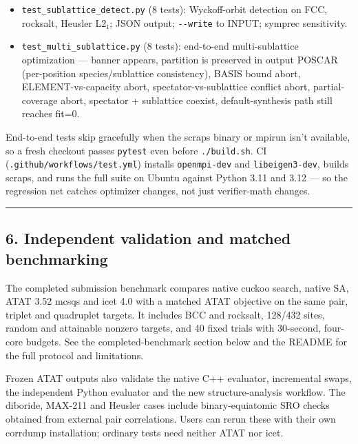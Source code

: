 \documentclass[
  11pt,
]{article}
\begin{document}
\begin{itemize}
  INPUT parser --- round-trip, section-order independence, disjointness
  errors, range errors, structural errors.
\item
  \texttt{test\_sublattice\_detect.py} (8 tests): Wyckoff-orbit
  detection on FCC, rocksalt, Heusler L2₁; JSON output;
  \texttt{-\/-write} to INPUT; symprec sensitivity.
\item
  \texttt{test\_multi\_sublattice.py} (8 tests): end-to-end
  multi-sublattice optimization --- banner appears, partition is
  preserved in output POSCAR (per-position species/sublattice
  consistency), BASIS bound abort, ELEMENT-vs-capacity abort,
  spectator-vs-sublattice conflict abort, partial-coverage abort,
  spectator + sublattice coexist, default-synthesis path still reaches
  fit=0.
\end{itemize}

End-to-end tests skip gracefully when the scraps binary or mpirun isn't
available, so a fresh checkout passes \texttt{pytest} even before
\texttt{./build.sh}. CI (\texttt{.github/workflows/test.yml}) installs
\texttt{openmpi-dev} and \texttt{libeigen3-dev}, builds scraps, and runs
the full suite on Ubuntu against Python 3.11 and 3.12 --- so the
regression net catches optimizer changes, not just verifier-math
changes.

\begin{center}\rule{0.5\linewidth}{0.5pt}\end{center}

\subsection{6. Independent validation and matched
benchmarking}\label{independent-validation-and-matched-benchmarking}

The completed submission benchmark compares native cuckoo search, native
SA, ATAT 3.52 mcsqs and icet 4.0 with a matched ATAT objective on the
same pair, triplet and quadruplet targets. It includes BCC and rocksalt,
128/432 sites, random and attainable nonzero targets, and 40 fixed
trials with 30-second, four-core budgets. See the completed-benchmark
section below and the README for the full protocol and limitations.

Frozen ATAT outputs also validate the native C++ evaluator, incremental
swaps, the independent Python evaluator and the new structure-analysis
workflow. The diboride, MAX-211 and Heusler cases include
binary-equiatomic SRO checks obtained from external pair correlations.
Users can rerun these with their own corrdump installation; ordinary
tests need neither ATAT nor icet.
\end{document}
